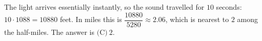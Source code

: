 The light arrives essentially instantly, so the sound travelled for $10$ seconds: $10\cdot1088=10880$ feet. In miles this is $\dfrac{10880}{5280}\approx2.06$, which is nearest to $2$ among the half-miles. The answer is $\boxed{\text{(C)}\ 2}$.
